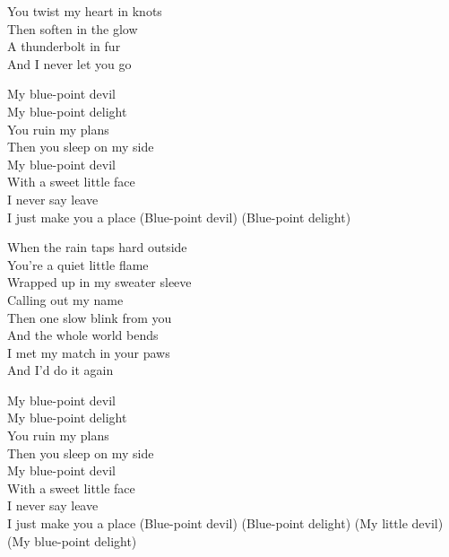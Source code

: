 \begin{lyrics}
You twist my heart in knots\\
Then soften in the glow\\
A thunderbolt in fur\\
And I never let you go

My blue-point devil\\
My blue-point delight\\
You ruin my plans\\
Then you sleep on my side\\
My blue-point devil\\
With a sweet little face\\
I never say leave\\
I just make you a place
(Blue-point devil)
(Blue-point delight)

When the rain taps hard outside\\
You're a quiet little flame\\
Wrapped up in my sweater sleeve\\
Calling out my name\\
Then one slow blink from you\\
And the whole world bends\\
I met my match in your paws\\
And I'd do it again

My blue-point devil\\
My blue-point delight\\
You ruin my plans\\
Then you sleep on my side\\
My blue-point devil\\
With a sweet little face\\
I never say leave\\
I just make you a place
(Blue-point devil)
(Blue-point delight)
(My little devil)
(My blue-point delight)
\end{lyrics}

